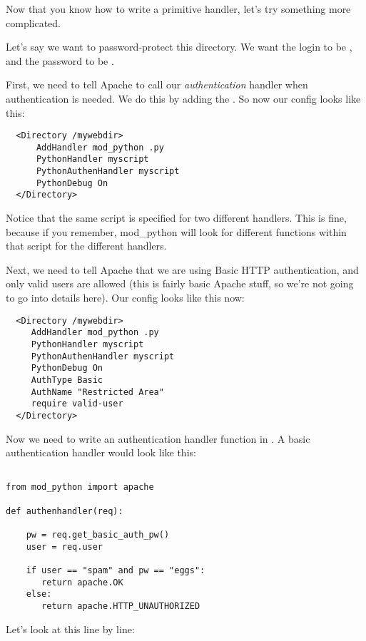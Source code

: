 Now that you know how to write a primitive handler, let's try
something more complicated.

Let's say we want to password-protect this directory. We want the
login to be , and the password to be .

First, we need to tell Apache to call our \emph{authentication}
handler when authentication is needed. We do this by adding the
. So now our config looks like this:

\begin{verbatim}
  <Directory /mywebdir>
      AddHandler mod_python .py
      PythonHandler myscript
      PythonAuthenHandler myscript
      PythonDebug On
  </Directory>
\end{verbatim}

Notice that the same script is specified for two different
handlers. This is fine, because if you remember, mod_python will look
for different functions within that script for the different handlers.

Next, we need to tell Apache that we are using Basic HTTP
authentication, and only valid users are allowed (this is fairly basic
Apache stuff, so we're not going to go into details here). Our config
looks like this now:

\begin{verbatim}
  <Directory /mywebdir>
     AddHandler mod_python .py
     PythonHandler myscript
     PythonAuthenHandler myscript
     PythonDebug On
     AuthType Basic
     AuthName "Restricted Area"
     require valid-user
  </Directory>
\end{verbatim}          

Now we need to write an authentication handler function in
. A basic authentication handler would look like
this:

\begin{verbatim}

from mod_python import apache

def authenhandler(req):

    pw = req.get_basic_auth_pw()
    user = req.user

    if user == "spam" and pw == "eggs":
       return apache.OK
    else:
       return apache.HTTP_UNAUTHORIZED
\end{verbatim}  

Let's look at this line by line: 

